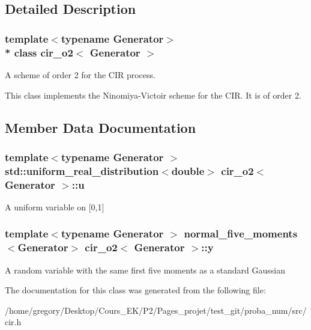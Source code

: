 \subsection{Detailed Description}
\subsubsection*{template$<$typename Generator$>$\\*
class cir\+\_\+o2$<$ Generator $>$}

A scheme of order 2 for the C\+IR process. 

This class implements the Ninomiya-\/\+Victoir scheme for the C\+IR. It is of order 2. 

\subsection{Member Data Documentation}
\subsubsection[{\texorpdfstring{u}{u}}]{\setlength{\rightskip}{0pt plus 5cm}template$<$typename Generator $>$ std\+::uniform\+\_\+real\+\_\+distribution$<$double$>$ {\bf cir\+\_\+o2}$<$ Generator $>$\+::u\hspace{0.3cm}{\ttfamily [protected]}}\hypertarget{classcir__o2_a37d01ddf0963358ef44dcb20938b54fa}{}\label{classcir__o2_a37d01ddf0963358ef44dcb20938b54fa}
A uniform variable on \mbox{[}0,1\mbox{]} 
\subsubsection[{\texorpdfstring{y}{y}}]{\setlength{\rightskip}{0pt plus 5cm}template$<$typename Generator $>$ {\bf normal\+\_\+five\+\_\+moments}$<$Generator$>$ {\bf cir\+\_\+o2}$<$ Generator $>$\+::y\hspace{0.3cm}{\ttfamily [protected]}}\hypertarget{classcir__o2_a13719fb45e809812b9f62916d6baba2c}{}\label{classcir__o2_a13719fb45e809812b9f62916d6baba2c}
A random variable with the same first five moments as a standard Gaussian 

The documentation for this class was generated from the following file\+:\begin{DoxyCompactItemize}
\item 
/home/gregory/\+Desktop/\+Cours\+\_\+\+E\+K/\+P2/\+Pages\+\_\+projet/test\+\_\+git/proba\+\_\+num/src/cir.\+h\end{DoxyCompactItemize}
